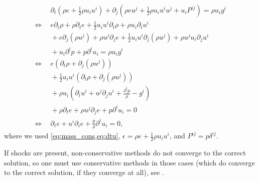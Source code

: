 \documentclass{article}
\begin{document}
\begin{align}
  & \partial_t\left(\rho e + \frac{1}{2}\rho u_i u^i\right)
  + \partial_j\left(\rho e u^j + \frac{1}{2}\rho u_i u^i u^j + u_i P^{ij}\right)
  = \rho u_i g^i
  \nonumber \\
  \Leftrightarrow\ \
  & e\partial_t\rho + \rho \partial_t e + \frac{1}{2}u_i u^i\partial_t \rho + \rho u_i\partial_t u^i
  \nonumber \\
  & {} + e\partial_j(\rho u^j) + \rho u^j \partial_j e + \frac{1}{2}u_i u^i \partial_j(\rho u^j)
    + \rho u^j u_i\partial_j u^i
  \nonumber \\
  & {} + u_i \partial^i p + p\partial^i u_i
  = \rho u_i g^i
  \nonumber \\
  \Leftrightarrow\ \
  & e\left(\partial_t \rho + \partial_j(\rho u^j)\right)
  \nonumber \\
  & {} + \frac{1}{2}u_i u^i\left(\partial_t \rho + \partial_j(\rho u^j)\right)
  \nonumber \\
  & {} + \rho u_i \left(\partial_t u^i + u^j\partial_j u^i + \frac{\partial^i p}{\rho} - g^i\right)
  \nonumber \\
  & {} + \rho \partial_t e + \rho u^j \partial_j e + p \partial^i u_i = 0
  \nonumber \\
  \Leftrightarrow\ \
  & \partial_t e + u^i\partial_i e + \frac{p}{\rho}\partial^i u_i = 0,
\end{align}
where we used \cref{eq:mass_cons,eq:dtu}, $\epsilon = \rho e + \frac{1}{2}\rho u_i u^i$, and
$P^{ij} = p\delta^{ij}$.

If shocks are present, non-conservative methods do not converge to the correct solution, so one must
use conservative methods in those cases (which do converge to the correct solution, if they converge
at all), see \citet[][\S 5.3]{toro}.

\newcommand{\vc}[1]{\mathrm{\bf #1}}
\end{document}
